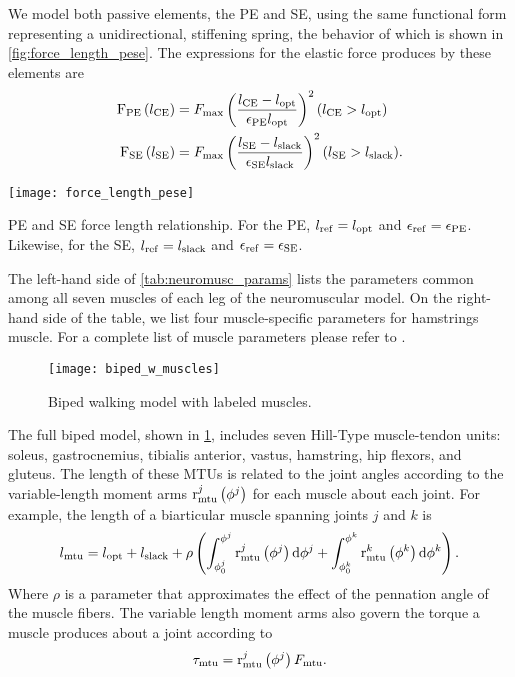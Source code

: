 We model both passive elements, the PE and SE, using the same functional form
representing a unidirectional, stiffening spring, the behavior of which is shown
in \cref{fig:force_length_pese}. The expressions for the elastic force produces
by these elements are
\begin{align}
    \func{F_\tn{PE}}{l_\tn{CE}} &= F_\tn{max} \left( \frac{l_\tn{CE} - l_\tn{opt}}{\epsilon_\tn{PE}
        l_\tn{opt}} \right)^2 (l_\tn{CE} > l_\tn{opt})\\
    \func{F_\tn{SE}}{l_\tn{SE}} &= F_\tn{max} \left( \frac{l_\tn{SE} - l_\tn{slack}}{\epsilon_\tn{SE}
        l_\tn{slack}} \right)^2 (l_\tn{SE} > l_\tn{slack}).
\end{align}
\begin{marginfigure}
    \centering
    \texttt{[image: force\_length\_pese]}
    \caption{PE and SE force length relationship. For the PE, $l_{\mathrm{ref}} = l_{\mathrm{opt}}$
    and $\epsilon_{\mathrm{ref}} = \epsilon_{\mathrm{PE}}$. Likewise, for the SE, $l_{\mathrm{ref}} =
    l_{\mathrm{slack}}$ and $\epsilon_{\mathrm{ref}} = \epsilon_{\mathrm{SE}}$.} 
    \label{fig:force_length_pese}
\end{marginfigure}

The left-hand side of \cref{tab:neuromusc_params} lists the parameters common
among all seven muscles of each leg of the neuromuscular model. On the
right-hand side of the table, we list four muscle-specific parameters for
hamstrings muscle. For a complete list of muscle parameters please refer
to \citet{song2015neural}. 

\begin{figure}[b]
    \centering
    \texttt{[image: biped\_w\_muscles]}
    \caption{Biped walking model with labeled muscles.} 
    \label{fig:biped_w_muscles}
\end{figure} 
The full biped model, shown in \cref{fig:biped_w_muscles}, includes
seven Hill-Type muscle-tendon units: soleus, gastrocnemius, tibialis anterior,
vastus, hamstring, hip flexors, and gluteus. The length of these MTUs is related
to the joint angles according to the variable-length moment arms
$\func{r}[\tn{mtu}][j]{\phi^j}$ for each muscle about each joint. For example,
the length of a biarticular muscle spanning joints $j$ and $k$ is
\begin{align}
    l_\tn{mtu} = l_\tn{opt} + l_\tn{slack} + \rho \left( \int_{\phi_0^j}^{\phi^j}
        \func{r}[\tn{mtu}][j]{\phi^j} \tn{d} \phi^j + \int_{\phi_0^k}^{\phi^k}
        \func{r}[\tn{mtu}][k]{\phi^k} \tn{d} \phi^k \right).
\end{align}
Where $\rho$ is a parameter that approximates the effect of the pennation angle 
of the muscle fibers. The variable length moment arms also govern the torque a
muscle produces about a joint according to
\begin{align}
    \tau_\tn{mtu} = \func{r}[\tn{mtu}][j]{\phi^j} F_\tn{mtu}.
\end{align}

